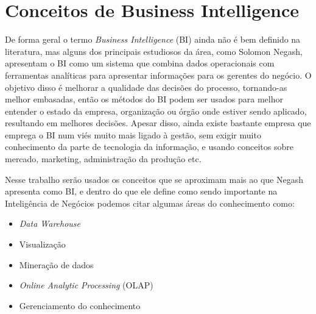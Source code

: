 \chapter{Conceitos de Business Intelligence}\label{cap_trabalho_academico}


De forma geral o termo \textit{Business Intelligence} (BI) ainda não é bem definido na literatura, mas alguns dos principais estudiosos da área, como Solomon Negash, apresentam o BI como um sistema que combina dados operacionais com ferramentas analíticas para apresentar informações para os gerentes do negócio. O objetivo disso é melhorar a qualidade das decisões do processo, tornando-as melhor embasadas, então os métodos do BI podem ser usados para melhor entender o estado da empresa, organização ou órgão onde estiver sendo aplicado, resultando em melhores decisões. Apesar disso, ainda existe bastante empresa que emprega o BI num viés muito mais ligado à gestão, sem exigir muito conhecimento da parte de tecnologia da informação, e usando conceitos sobre mercado, marketing, administração da produção etc. 

Nesse trabalho serão usados os conceitos que se aproximam mais ao que Negash apresenta como BI, e dentro do que ele define como sendo importante na Inteligência de Negócios podemos citar algumas áreas do conhecimento como:

\begin{itemize}
	\item \textit{Data Warehouse}
	\item Visualização
	\item Mineração de dados
	\item \textit{Online Analytic Processing} (OLAP)
	\item Gerenciamento do conhecimento
\end{itemize}

